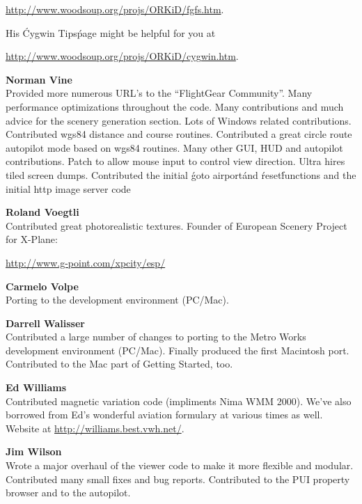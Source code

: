  \href{http://www.woodsoup.org/projs/ORKiD/fgfs.htm}{http://www.woodsoup.org/projs/ORKiD/fgfs.htm}.
 \medskip

\noindent
  His \'Cygwin Tips\' page might be helpful for you at
  \medskip



   \href{http://www.woodsoup.org/projs/ORKiD/cygwin.htm}{http://www.woodsoup.org/projs/ORKiD/cygwin.htm}.
  \medskip

\noindent \textbf{Norman Vine}\\
  Provided more numerous URL's to the ``FlightGear Community''.
  Many performance optimizations throughout the code.  Many contributions
  and much advice for the scenery generation section.  Lots of Windows
  related contributions. Contributed wgs84 distance and course routines.
  Contributed a great circle route autopilot mode based on wgs84 routines.
  Many other GUI, HUD and autopilot contributions.  Patch to allow mouse input to control view direction. Ultra hires tiled screen dumps. Contributed the initial \'goto airport\' and \'reset\' functions and the initial http image server code
\medskip

\noindent \textbf{Roland Voegtli}\\
 Contributed great photorealistic textures.   Founder of European Scenery Project for
 X-Plane:
 \medskip

  \href{http://www.g-point.com/xpcity/esp/}{http://www.g-point.com/xpcity/esp/}
\medskip


\noindent \textbf{Carmelo Volpe}\\
  Porting \FlightGear{} to the  development environment
  (PC/Mac).
 \medskip

\noindent \textbf{Darrell Walisser}\\
 Contributed a large number of changes to porting \FlightGear{} to the Metro Works development environment (PC/Mac). Finally produced the first Macintosh port. Contributed to the Mac part of Getting Started, too.
\medskip

\noindent \textbf{Ed Williams}\\
  Contributed magnetic variation code (impliments Nima WMM 2000).
  We've also borrowed from Ed's wonderful aviation formulary at various
  times as well. Website at
  \medskip
  \href{http://williams.best.vwh.net/}{http://williams.best.vwh.net/}.
 \medskip


\noindent \textbf{Jim Wilson}\\
 Wrote a major overhaul of the viewer code to make it more flexible and modular. Contributed many small fixes and bug reports. Contributed to the PUI property browser and to the autopilot.
 \medskip

